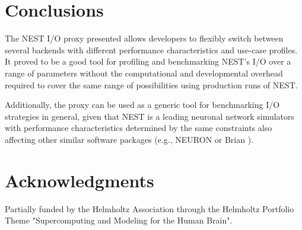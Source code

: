 \documentclass[]{YIC2015}
\begin{document}
\section{Conclusions}

The NEST I/O proxy presented allows developers to flexibly switch
between several backends with different performance characteristics
and use-case profiles. It proved to be a good tool for profiling and
benchmarking NEST's I/O over a range of parameters without the
computational and developmental overhead required to cover the same
range of possibilities using production runs of NEST.

Additionally, the proxy can be used as a generic tool for benchmarking
I/O strategies in general, given that NEST is a leading neuronal
network simulators with performance characteristics determined by the
same constraints also affecting other similar software packages (e.g.,
NEURON \cite{neuron} or Brian \cite{brian}).

\section*{Acknowledgments}

Partially funded by the Helmholtz Association through the Helmholtz
Portfolio Theme "Supercomputing and Modeling for the Human Brain".
\end{document}
